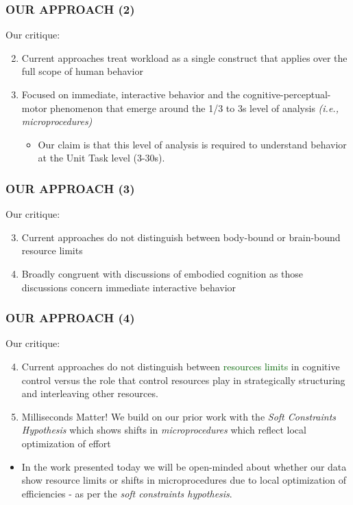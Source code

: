 \documentclass{beamer}
\begin{document}
\begin{frame}
	\frametitle{OUR APPROACH (2)}
Our critique:
	\begin{enumerate}[<+-| alert@+>]
		\setcounter{enumi}{1}
		\item Current approaches treat workload as a single construct that applies over the full scope of human behavior
		\setcounter{enumi}{1}
		\item Focused on immediate, interactive behavior and the cognitive-perceptual-motor phenomenon that emerge around the 1/3 to 3s level of analysis \emph{(i.e., microprocedures)}
		\begin{itemize}
			\item Our claim is that this level of analysis is required to understand behavior at the Unit Task level \parencite{cmn1983} (3-30s).
		\end{itemize}
	\end{enumerate}
\end{frame}


\begin{frame}
	\frametitle{OUR APPROACH (3)}
Our critique:
	\begin{enumerate}[<+-| alert@+>]
		\setcounter{enumi}{2}
		\item Current approaches do not distinguish between body-bound or brain-bound resource limits
		\setcounter{enumi}{2}
		\item Broadly congruent with discussions of embodied cognition \parencite{clark08,rupert10,km97} as those discussions concern immediate interactive behavior
	\end{enumerate}
\end{frame}

\begin{frame}
	\frametitle{OUR APPROACH (4)}
Our critique:
	\begin{enumerate}[<+-| alert@+>]
		\setcounter{enumi}{3}
		\item Current approaches do not distinguish between \textcolor{darkgreen}{resources limits} in cognitive control versus the role that \textcolor{wdgRed}{control resources play} in \textcolor{wdgRed}{strategically structuring and interleaving} other resources.
		\setcounter{enumi}{3}
		\item \alert{Milliseconds Matter!} We build on our prior work with the \emph{Soft Constraints Hypothesis} \parencite{gray06pr} which shows shifts in \emph{microprocedures} which reflect local optimization of effort
	\end{enumerate}
\pause
	\begin{itemize}
			\item In the work presented today we will be open-minded about whether our data show \alert{resource limits} or \alert{shifts in microprocedures} due to local optimization of efficiencies - as per the \emph{soft constraints hypothesis}.
		\end{itemize}

\end{frame}
\end{document}
